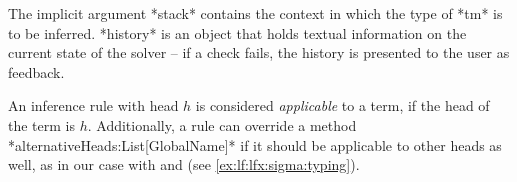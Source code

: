 The implicit argument *stack* contains the context in which the type of *tm* is to be inferred. *history* is an object that holds textual information on the current state of the solver -- if a check fails, the history is presented to the user as feedback.

An inference rule with head $h$ is considered \emph{applicable} to a term, if the head of the term is $h$. Additionally, a rule can override
a method *alternativeHeads:List[GlobalName]* if it should be applicable to other heads as well, as in our case with  and  (see \autoref{ex:lf:lfx:sigma:typing}).

%  
